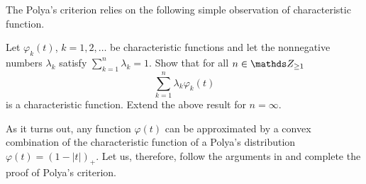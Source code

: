The Polya's criterion relies on the following simple observation of characteristic function.
\begin{exercise}
Let $\varphi_k(t)$, $k=1,2,\dots$ be characteristic functions and let the nonnegative numbers $\lambda_k$ satisfy $\sum_{k=1}^n \lambda_k = 1$. Show that for all $n \in \Z_{\geq 1}$
\begin{equation*}
    \sum_{k=1}^n \lambda_k \varphi_k(t)
\end{equation*}
is a characteristic function. Extend the above result for $n = \infty$.
\end{exercise}

As it turns out, any function $\varphi(t)$ can be approximated by a convex combination of the characteristic function of a Polya's distribution $\varphi(t) = (1-|t|)_+$. Let us, therefore, follow the arguments in \cite{Billingsley} and complete the proof of Polya's criterion.

